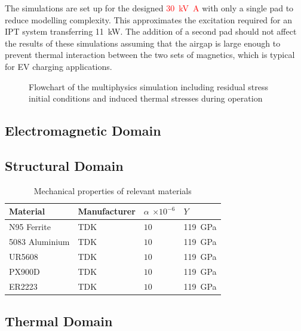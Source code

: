 \documentclass[conference]{IEEEtran}
\begin{document}
The simulations are set up for the designed \textcolor{red}{\SI{30}{\kilo\volt\ampere}} with only a single pad to reduce modelling complexity. 
This approximates the excitation required for an IPT system transferring \SI{11}{\kilo\watt}. 
The addition of a second pad should not affect the results of these simulations assuming that the airgap is large enough to prevent thermal interaction between the two sets of magnetics, which is typical for EV charging applications.

\begin{figure}
  
  \caption{Flowchart of the multiphysics simulation including residual stress initial conditions and induced thermal stresses during operation}
  \label{fig:simulationflowchart}
\end{figure}

\subsection{Electromagnetic Domain}

\lipsum[2]

\subsection{Structural Domain} 

\lipsum[2]

\begin{table}
  \centering
  \caption{Mechanical properties of relevant materials}
  \begin{tabular}{@{}llll@{}}
    \toprule
    Material & Manufacturer & $\alpha$ $\times 10^{-6}$ & $Y$ \\ \midrule
    N95 Ferrite & TDK & $10$ & \SI{119}{\giga\pascal} \\
    5083 Aluminium & TDK & $10$ & \SI{119}{\giga\pascal} \\
    UR5608 & TDK & $10$ & \SI{119}{\giga\pascal} \\
    PX900D & TDK & $10$ & \SI{119}{\giga\pascal} \\
    ER2223 & TDK & $10$ & \SI{119}{\giga\pascal} \\
    \bottomrule
  \end{tabular}
\end{table}

\subsection{Thermal Domain}
\end{document}
